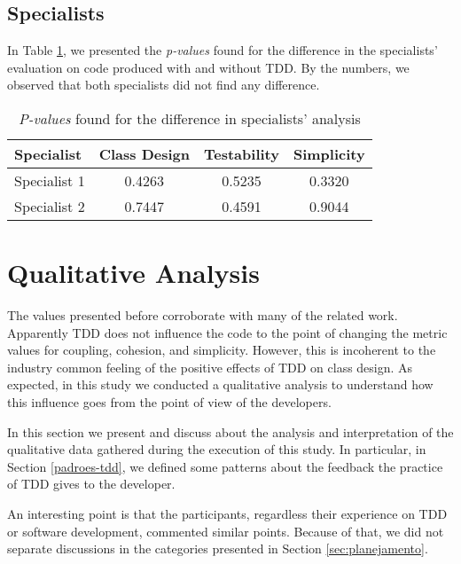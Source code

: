 \documentclass[conference]{IEEEtran}
\begin{document}
\subsection{Specialists}

In Table
\ref{tab:especialistas-industria}, we presented the \textit{p-values} found for the
difference in the specialists' evaluation on code produced with and without TDD.
By the numbers, we observed that both specialists did not find any difference.

\begin{table}[h!]
	\centering
	\begin{tabular}{| p{2cm} | c | c | c | }
		\hline
		\textbf{Specialist} & \textbf{Class Design} & \textbf{Testability} & \textbf{Simplicity}\\
		\hline
		Specialist 1 &	0.4263 &	0.5235 &	0.3320\\
		Specialist 2 &	0.7447 &	0.4591 &	0.9044\\
		\hline
	\end{tabular}
	\caption{\textit{P-values} found for the difference in specialists' analysis}
	\label{tab:especialistas-industria}
\end{table}

\section{Qualitative Analysis}

The values presented before corroborate with many of the related work.
Apparently TDD does not influence the code to the point of changing
the metric values for coupling, cohesion, and simplicity. However, this is
incoherent to the industry common feeling of the positive effects of TDD on class design.
As expected, in this study we conducted a qualitative analysis to understand
how this influence goes from the point of view of the developers.

In this section we present and discuss about the analysis and interpretation of
the qualitative data gathered during the execution of this study. In particular,
in Section \ref{padroes-tdd}, we defined some patterns about the feedback the practice
of TDD gives to the developer.

An interesting point is that the participants, regardless their experience on TDD or
software development, commented similar points. Because of that, we did not separate
discussions in the categories presented in Section \ref{sec:planejamento}.
\end{document}
